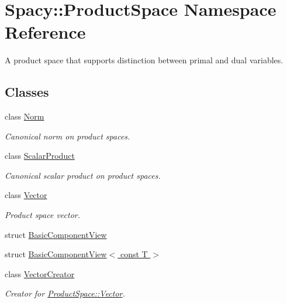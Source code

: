 \hypertarget{namespaceSpacy_1_1ProductSpace}{\section{\-Spacy\-:\-:\-Product\-Space \-Namespace \-Reference}
\label{namespaceSpacy_1_1ProductSpace}
}


\-A product space that supports distinction between primal and dual variables.  


\subsection*{\-Classes}
\begin{DoxyCompactItemize}
\item 
class \hyperlink{classSpacy_1_1ProductSpace_1_1Norm}{\-Norm}
\begin{DoxyCompactList}\small\item\em \-Canonical norm on product spaces. \end{DoxyCompactList}\item 
class \hyperlink{classSpacy_1_1ProductSpace_1_1ScalarProduct}{\-Scalar\-Product}
\begin{DoxyCompactList}\small\item\em \-Canonical scalar product on product spaces. \end{DoxyCompactList}\item 
class \hyperlink{classSpacy_1_1ProductSpace_1_1Vector}{\-Vector}
\begin{DoxyCompactList}\small\item\em \-Product space vector. \end{DoxyCompactList}\item 
struct \hyperlink{structSpacy_1_1ProductSpace_1_1BasicComponentView}{\-Basic\-Component\-View}
\item 
struct \hyperlink{structSpacy_1_1ProductSpace_1_1BasicComponentView_3_01const_01T_01_4}{\-Basic\-Component\-View$<$ const T $>$}
\item 
class \hyperlink{classSpacy_1_1ProductSpace_1_1VectorCreator}{\-Vector\-Creator}
\begin{DoxyCompactList}\small\item\em \-Creator for \hyperlink{classSpacy_1_1ProductSpace_1_1Vector}{\-Product\-Space\-::\-Vector}. \end{DoxyCompactList}\end{DoxyCompactItemize}
